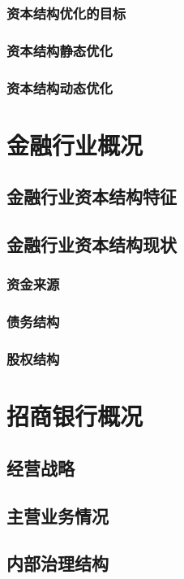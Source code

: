 \subsection{资本结构优化的目标}
\subsection{资本结构静态优化}
\subsection{资本结构动态优化}


\chapter{金融行业概况}

\section{金融行业资本结构特征}

\section{金融行业资本结构现状}
\subsection{资金来源}
\subsection{债务结构}
\subsection{股权结构}

\chapter{招商银行概况}
\section{经营战略}
\section{主营业务情况}
\section{内部治理结构}


